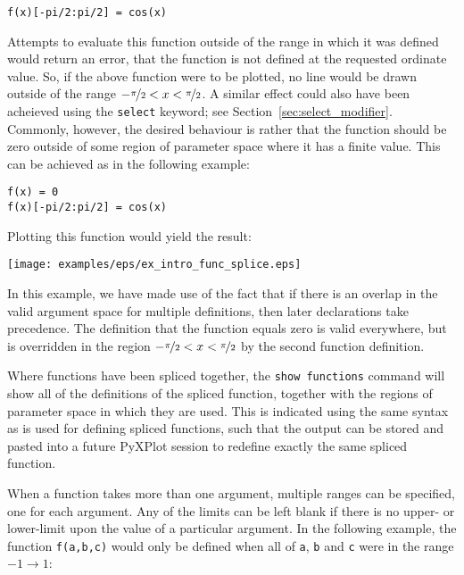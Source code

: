 \begin{verbatim}
f(x)[-pi/2:pi/2] = cos(x)
\end{verbatim}

\noindent Attempts to evaluate this function outside of the range in which it
was defined would return an error, that the function is not defined at the
requested ordinate value. So, if the above function were to be plotted, no line
would be drawn outside of the range $-\nicefrac{\pi}{2}<x<\nicefrac{\pi}{2}$. A
similar effect could also have been acheieved using the {\tt select} keyword;
see Section~\ref{sec:select_modifier}. Commonly, however, the desired behaviour
is rather that the function should be zero outside of some region of parameter
space where it has a finite value. This can be achieved as in the following
example:

\begin{verbatim}
f(x) = 0
f(x)[-pi/2:pi/2] = cos(x)
\end{verbatim}

\noindent Plotting this function would yield the result:

\begin{center}
\texttt{[image: examples/eps/ex\_intro\_func\_splice.eps]}
\end{center}

\noindent In this example, we have made use of the fact that if there is an
overlap in the valid argument space for multiple definitions, then later
declarations take precedence. The definition that the function equals zero is
valid everywhere, but is overridden in the region
$-\nicefrac{\pi}{2}<x<\nicefrac{\pi}{2}$ by the second function definition.

Where functions have been spliced together, the {\tt show functions} command
will show all of the definitions of the spliced function, together with the
regions of parameter space in which they are used. This is indicated using the
same syntax as is used for defining spliced functions, such that the output can
be stored and pasted into a future PyXPlot session to redefine exactly the same
spliced function.

When a function takes more than one argument, multiple ranges can be specified,
one for each argument. Any of the limits can be left blank if there is no
upper- or lower-limit upon the value of a particular argument. In the following
example, the function {\tt f(a,b,c)} would only be defined when all of {\tt a},
{\tt b} and {\tt c} were in the range $-1 \to 1$:

